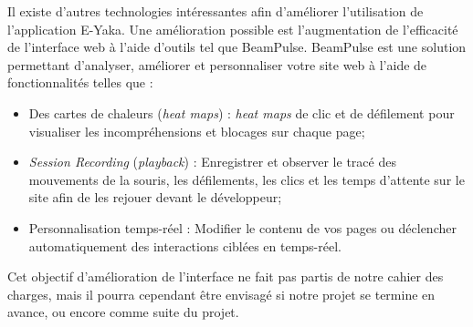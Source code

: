            Il existe d'autres technologies intéressantes afin d'améliorer l'utilisation de l'application E-Yaka. Une  amélioration possible est l'augmentation de l'efficacité de l'interface web à l'aide d'outils tel que BeamPulse. BeamPulse est une solution permettant d'analyser, améliorer et personnaliser votre site web à l'aide de fonctionnalités telles que :
            \begin{itemize}
                \item Des cartes de chaleurs (\emph{heat maps}) : \emph{heat maps} de clic et de défilement pour visualiser les incompréhensions et blocages sur chaque page;
                \item \emph{Session Recording} (\emph{playback}) : Enregistrer et observer le tracé des mouvements de la souris, les défilements, les clics et les temps d'attente sur le site afin de les rejouer devant le développeur;
                \item Personnalisation temps-réel : Modifier le contenu de vos pages ou déclencher automa\-tiquement des interactions ciblées en temps-réel.
            \end{itemize}
            
            Cet objectif d'amélioration de l'interface ne fait pas partis de notre cahier des charges, mais il pourra cependant être envisagé si notre projet se termine en avance, ou encore comme suite du projet.
        